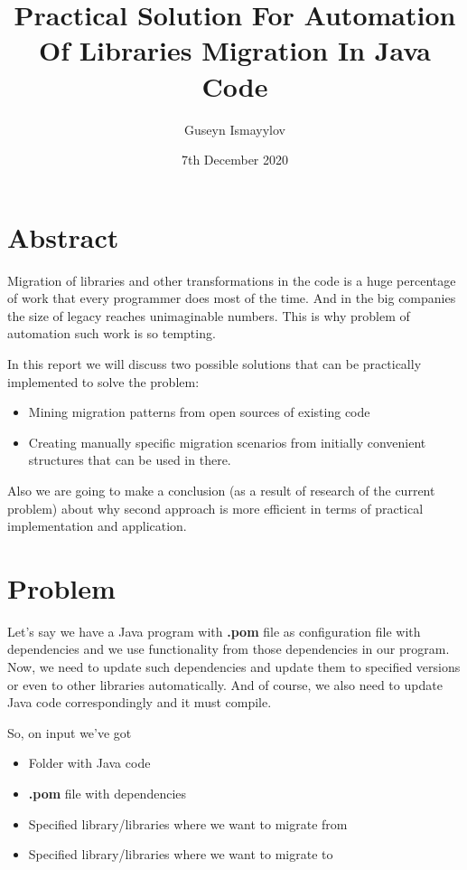\documentclass[sigplan,screen,11pt]{acmart}
\title{Practical Solution For Automation Of Libraries Migration In Java Code}
\author{Guseyn Ismayylov}
\date{7th December 2020}
\begin{document}
\maketitle

\section{Abstract}

Migration of libraries and other transformations in the code is a huge percentage of work that every programmer does most of the time. And in the big companies the size of legacy reaches unimaginable numbers. This is why problem of automation such work is so tempting.

In this report we will discuss two possible solutions that can be practically implemented to solve the problem: 
\begin{itemize}
  \item Mining migration patterns from open sources of existing code
  \item Creating manually specific migration scenarios from initially convenient structures that can be used in there.
\end{itemize}

Also we are going to make a conclusion (as a result of research of the current problem) about why second approach is more efficient in terms of practical implementation and application.

\section{Problem}

Let's say we have a Java program with \textbf{.pom} file as configuration file with dependencies and we use functionality from those dependencies in our program. Now, we need to update such dependencies and update them to specified versions or even to other libraries automatically. And of course, we also need to update Java code correspondingly and it must compile.

So, on input we've got
\begin{itemize}
  \item Folder with Java code
  \item \textbf{.pom} file with dependencies
  \item Specified library/libraries where we want to migrate from
  \item Specified library/libraries where we want to migrate to
\end{itemize}
\end{document}
